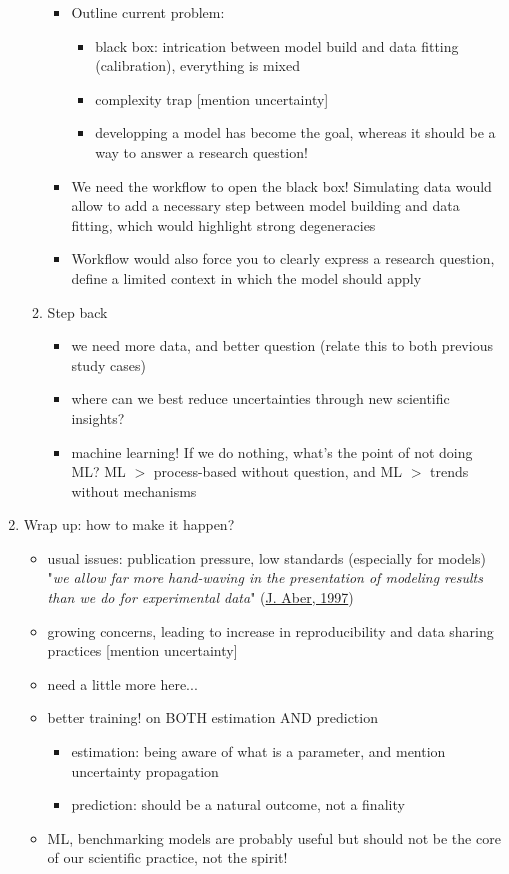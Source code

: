 \documentclass[11pt]{article}
\begin{document}
\begin{enumerate}
\begin{enumerate}
\begin{itemize}
\item Outline current problem:
\begin{itemize}
\item black box: intrication between model build and data fitting (calibration), everything is mixed 
\item complexity trap [mention uncertainty]
\item developping a model has become the goal, whereas it should be a way to answer a research question!
\end{itemize}
\item We need the workflow to open the black box! Simulating data would allow to add a necessary step between model building and data fitting, which would highlight strong degeneracies
\item Workflow would also force you to clearly express a research question, define a limited context in which the model should apply
\end{itemize}
\item Step back
\begin{itemize}
\item we need more data, and better question (relate this to both previous study cases)
\item where can we best reduce uncertainties through new scientific insights?
\item machine learning! If we do nothing, what's the point of not doing ML? ML $>$ process-based without question, and ML $>$ trends without mechanisms
\end{itemize}
\end{enumerate}
\item Wrap up: how to make it happen?
\begin{itemize}
\item usual issues: publication pressure, low standards (especially for models)\\
"\emph{we allow far more hand-waving in the presentation of modeling results than we do for experimental data}" (\href{https://harvardforest1.fas.harvard.edu/publications/pdfs/Aber_BulletinEcoSocAmerica_1997.pdf}{J. Aber, 1997})
\item growing concerns, leading to increase in reproducibility and data sharing practices [mention uncertainty]
\item need a little more here...
\item better training! on BOTH estimation AND prediction
\begin{itemize}
\item estimation: being aware of what is a parameter, and mention uncertainty propagation
\item prediction: should be a natural outcome, not a finality
\end{itemize}
\item ML, benchmarking models are probably useful but should not be the core of our scientific practice, not the spirit!
\end{itemize}
\end{enumerate}
\end{document}
